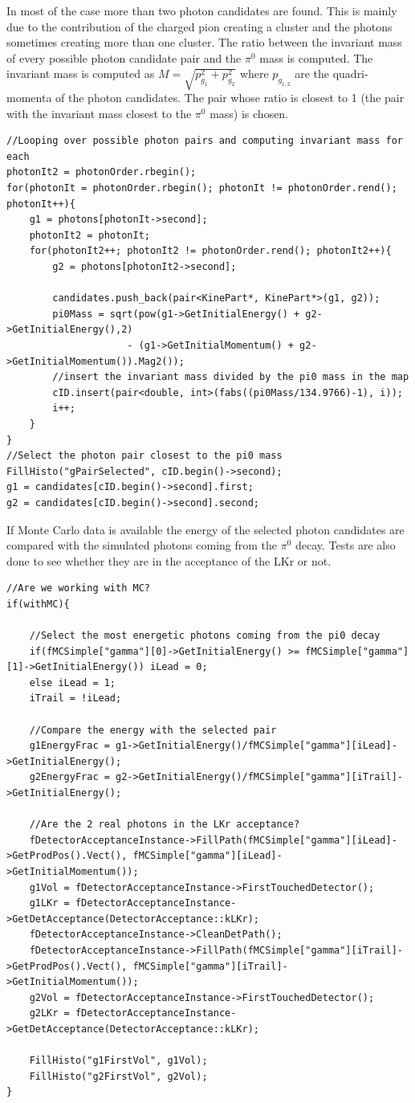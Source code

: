 In most of the case more than two photon candidates are found. This is mainly due to the
contribution of the charged pion creating a cluster and the photons sometimes creating more than one
cluster. The ratio between the invariant mass of every possible photon candidate pair and the
$\pi^0$ mass is computed. The invariant mass is computed as $M = \sqrt{p_{g_1}^2 + p_{g_2}^2}$ where
$p_{g_{1,2}}$ are the quadri-momenta of the photon candidates. The pair whose ratio is closest to 1
(the pair with the invariant mass closest to the $\pi^0$ mass) is chosen.
\begin{lstlisting}
//Looping over possible photon pairs and computing invariant mass for each
photonIt2 = photonOrder.rbegin();
for(photonIt = photonOrder.rbegin(); photonIt != photonOrder.rend(); photonIt++){
	g1 = photons[photonIt->second];
	photonIt2 = photonIt;
	for(photonIt2++; photonIt2 != photonOrder.rend(); photonIt2++){
		g2 = photons[photonIt2->second];

		candidates.push_back(pair<KinePart*, KinePart*>(g1, g2));
		pi0Mass = sqrt(pow(g1->GetInitialEnergy() + g2->GetInitialEnergy(),2)
					 - (g1->GetInitialMomentum() + g2->GetInitialMomentum()).Mag2());
		//insert the invariant mass divided by the pi0 mass in the map
		cID.insert(pair<double, int>(fabs((pi0Mass/134.9766)-1), i));
		i++;
	}
}
//Select the photon pair closest to the pi0 mass
FillHisto("gPairSelected", cID.begin()->second);
g1 = candidates[cID.begin()->second].first;
g2 = candidates[cID.begin()->second].second;
\end{lstlisting}

If Monte Carlo data is available the energy of the selected photon candidates are compared with the
simulated photons coming from the $\pi^0$ decay. Tests are also done to see whether they are in the
acceptance of the LKr or not. 
\begin{lstlisting}
//Are we working with MC?
if(withMC){

	//Select the most energetic photons coming from the pi0 decay
	if(fMCSimple["gamma"][0]->GetInitialEnergy() >= fMCSimple["gamma"][1]->GetInitialEnergy()) iLead = 0;
	else iLead = 1;
	iTrail = !iLead;

	//Compare the energy with the selected pair
	g1EnergyFrac = g1->GetInitialEnergy()/fMCSimple["gamma"][iLead]->GetInitialEnergy();
	g2EnergyFrac = g2->GetInitialEnergy()/fMCSimple["gamma"][iTrail]->GetInitialEnergy();

	//Are the 2 real photons in the LKr acceptance?
	fDetectorAcceptanceInstance->FillPath(fMCSimple["gamma"][iLead]->GetProdPos().Vect(), fMCSimple["gamma"][iLead]->GetInitialMomentum());
	g1Vol = fDetectorAcceptanceInstance->FirstTouchedDetector();
	g1LKr = fDetectorAcceptanceInstance->GetDetAcceptance(DetectorAcceptance::kLKr);
	fDetectorAcceptanceInstance->CleanDetPath();
	fDetectorAcceptanceInstance->FillPath(fMCSimple["gamma"][iTrail]->GetProdPos().Vect(), fMCSimple["gamma"][iTrail]->GetInitialMomentum());
	g2Vol = fDetectorAcceptanceInstance->FirstTouchedDetector();
	g2LKr = fDetectorAcceptanceInstance->GetDetAcceptance(DetectorAcceptance::kLKr);

	FillHisto("g1FirstVol", g1Vol);
	FillHisto("g2FirstVol", g2Vol);
}
\end{lstlisting}

